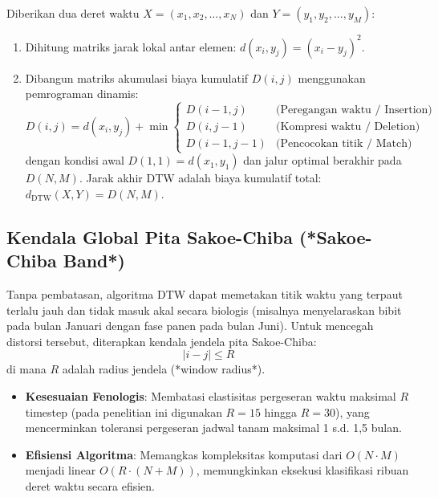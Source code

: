 \documentclass[11pt,a4paper]{article}
\begin{document}
Diberikan dua deret waktu $X = (x_1, x_2, \dots, x_N)$ dan $Y = (y_1, y_2, \dots, y_M)$:
\begin{enumerate}
    \item Dihitung matriks jarak lokal antar elemen: $d(x_i, y_j) = (x_i - y_j)^2$.
    \item Dibangun matriks akumulasi biaya kumulatif $D(i, j)$ menggunakan pemrograman dinamis:
    \begin{equation}
        D(i, j) = d(x_i, y_j) + \min \begin{cases}
            D(i-1, j)   & \text{(Peregangan waktu / Insertion)} \\
            D(i, j-1)   & \text{(Kompresi waktu / Deletion)} \\
            D(i-1, j-1) & \text{(Pencocokan titik / Match)}
        \end{cases}
    \end{equation}
    dengan kondisi awal $D(1, 1) = d(x_1, y_1)$ dan jalur optimal berakhir pada $D(N, M)$. Jarak akhir DTW adalah biaya kumulatif total: $d_{\text{DTW}}(X, Y) = D(N, M)$.
\end{enumerate}

\subsection{Kendala Global Pita Sakoe-Chiba (*Sakoe-Chiba Band*)}
Tanpa pembatasan, algoritma DTW dapat memetakan titik waktu yang terpaut terlalu jauh dan tidak masuk akal secara biologis (misalnya menyelaraskan bibit pada bulan Januari dengan fase panen pada bulan Juni). Untuk mencegah distorsi tersebut, diterapkan kendala jendela pita Sakoe-Chiba:
\begin{equation}
    |i - j| \le R
\end{equation}
di mana $R$ adalah radius jendela (*window radius*).
\begin{itemize}
    \item \textbf{Kesesuaian Fenologis}: Membatasi elastisitas pergeseran waktu maksimal $R$ timestep (pada penelitian ini digunakan $R = 15$ hingga $R = 30$), yang mencerminkan toleransi pergeseran jadwal tanam maksimal 1 s.d. 1{,}5 bulan.
    \item \textbf{Efisiensi Algoritma}: Memangkas kompleksitas komputasi dari $O(N \cdot M)$ menjadi linear $O(R \cdot (N+M))$, memungkinkan eksekusi klasifikasi ribuan deret waktu secara efisien.
\end{itemize}
\end{document}
